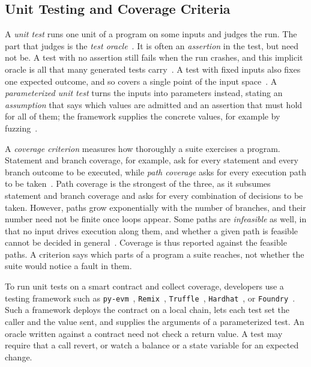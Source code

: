 \documentclass[manuscript,anonymous]{acmart}
\newcommand{\tool}[1]{\texttt{#1}}
\begin{document}
\subsection{Unit Testing and Coverage Criteria}

A \emph{unit test} runs one unit of a program on some inputs and judges the
run. The part that judges is the \emph{test oracle}~\cite{Barr2015}. It is
often an \emph{assertion} in the test, but need not be. A test with no
assertion still fails when the run crashes, and this implicit oracle is all
that many generated tests carry~\cite{Barr2015}. A test with fixed inputs also
fixes one expected outcome, and so covers a single point of the input
space~\cite{Tillmann2005}. A \emph{parameterized unit test} turns the inputs
into parameters instead, stating an \emph{assumption} that says which values
are admitted and an assertion that must hold for all of them; the framework
supplies the concrete values, for example by
fuzzing~\cite{Tillmann2005,Claessen2000}.

A \emph{coverage criterion} measures how thoroughly a suite exercises a
program. Statement and branch coverage, for example, ask for every statement
and every branch outcome to be executed, while \emph{path coverage} asks for
every execution path to be taken~\cite{Howden1976}. Path coverage is the
strongest of the three, as it subsumes statement and branch coverage and asks
for every combination of decisions to be taken. However, paths grow
exponentially with the number of branches, and their number need not be finite
once loops appear. Some paths are \emph{infeasible} as well, in that no input
drives execution along them, and whether a given path is feasible cannot be
decided in general~\cite{AmmannOffutt}. Coverage is thus reported against the
feasible paths. A criterion says which parts of a program a suite reaches, not
whether the suite would notice a fault in them.

To run unit tests on a smart contract and collect coverage, developers use a testing
framework such as \tool{py-evm}~\cite{pyevm}, \tool{Remix}~\cite{remix},
\tool{Truffle}~\cite{truffle}, \tool{Hardhat}~\cite{hardhat}, or
\tool{Foundry}~\cite{foundry}. Such a framework deploys the contract on a local
chain, lets each test set the caller and the value sent, and supplies the
arguments of a parameterized test. An oracle written against a contract need
not check a return value. A test may require that a call revert, or watch a
balance or a state variable for an expected change.
\end{document}
